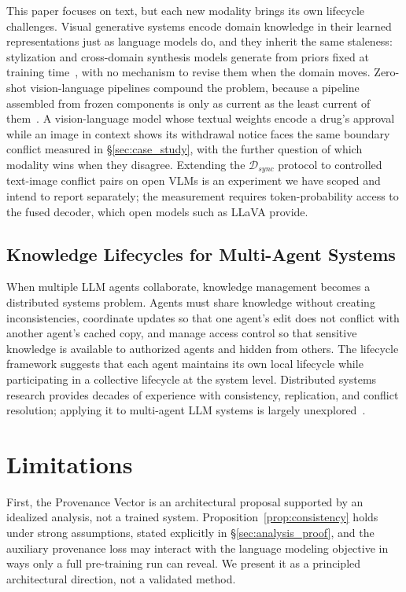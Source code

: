 \documentclass[manuscript, screen, review]{jair}
\begin{document}
This paper focuses on text, but each new modality brings its own lifecycle challenges. Visual generative systems encode domain knowledge in their learned representations just as language models do, and they inherit the same staleness: stylization and cross-domain synthesis models generate from priors fixed at training time~\citep{thakur2021whitebox, thakur2021aoda}, with no mechanism to revise them when the domain moves. Zero-shot vision-language pipelines compound the problem, because a pipeline assembled from frozen components is only as current as the least current of them~\citep{thakur2026accident}. A vision-language model whose textual weights encode a drug's approval while an image in context shows its withdrawal notice faces the same boundary conflict measured in \S\ref{sec:case_study}, with the further question of which modality wins when they disagree. Extending the $\mathcal{D}_{sync}$ protocol to controlled text-image conflict pairs on open VLMs is an experiment we have scoped and intend to report separately; the measurement requires token-probability access to the fused decoder, which open models such as LLaVA provide.

\subsection{Knowledge Lifecycles for Multi-Agent Systems}

When multiple LLM agents collaborate, knowledge management becomes a distributed systems problem. Agents must share knowledge without creating inconsistencies, coordinate updates so that one agent's edit does not conflict with another agent's cached copy, and manage access control so that sensitive knowledge is available to authorized agents and hidden from others. The lifecycle framework suggests that each agent maintains its own local lifecycle while participating in a collective lifecycle at the system level. Distributed systems research provides decades of experience with consistency, replication, and conflict resolution; applying it to multi-agent LLM systems is largely unexplored~\citep{wang2024agents}.

\section{Limitations}
\label{sec:limitations}

First, the Provenance Vector is an architectural proposal supported by an idealized analysis, not a trained system. Proposition~\ref{prop:consistency} holds under strong assumptions, stated explicitly in \S\ref{sec:analysis_proof}, and the auxiliary provenance loss may interact with the language modeling objective in ways only a full pre-training run can reveal. We present it as a principled architectural direction, not a validated method.
\end{document}
